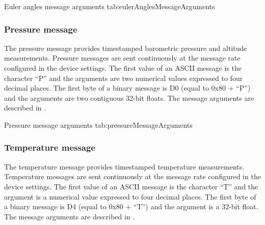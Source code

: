 \begingroup
    \def\tempArgumentA{Roll angle in degrees}
    \def\tempArgumentB{Pitch angle in degrees}
    \def\tempArgumentC{Yaw angle in degrees}
    \dataMessageTable
    {Euler angles message arguments}
    {tab:eulerAnglesMessageArguments}
\endgroup

\begingroup
    \def\tempNameA{Roll angle}
    \def\tempNameB{Pitch angle}
    \def\tempNameC{Yaw angle}
    \def\tempValueA{0.0}
    \def\tempValueB{0.0}
    \def\tempValueC{0.0}
    \def\tempAsciiFirst{E}
    \def\tempAsciiA{0.0000}
    \def\tempAsciiB{0.0000}
    \def\tempAsciiC{0.0000}
    \def\tempBinaryFirst{C5}
    \def\tempBinaryA{00 00 00 00}
    \def\tempBinaryB{00 00 00 00}
    \def\tempBinaryC{00 00 00 00}
    \dataMessageExample
\endgroup

\subsubsection{Pressure message}

The pressure message provides timestamped barometric pressure and altitude measurements.  Pressure messages are sent continuously at the message rate configured in the device settings.  The first value of an \ac{ASCII} message is the character \enquote{P} and the arguments are two numerical values expressed to four decimal places.  The first byte of a binary message is D0 (equal to 0x80 + \enquote{P}) and the arguments are two contiguous 32-bit floats.  The message arguments are described in .

\begingroup
    \def\tempArgumentA{Barometric air pressure in millibars}
    \def\tempArgumentB{Altitude in metres}
    \dataMessageTable
    {Pressure message arguments}
    {tab:pressureMessageArguments}
\endgroup

\begingroup
    \def\tempNameA{Pressure}
    \def\tempNameB{Altitude}
    \def\tempValueA{1023.14}
    \def\tempValueB{0.0}
    \def\tempAsciiFirst{P}
    \def\tempAsciiA{1023.1400}
    \def\tempAsciiB{0.0000}
    \def\tempBinaryFirst{D0}
    \def\tempBinaryA{00 50 7D 44}
    \def\tempBinaryB{00 00 00 00}
    \dataMessageExample
\endgroup

\subsubsection{Temperature message}

The temperature message provides timestamped temperature measurements.  Temperature messages are sent continuously at the message rate configured in the device settings.  The first value of an \ac{ASCII} message is the character \enquote{T} and the argument is a numerical value expressed to four decimal places.  The first byte of a binary message is D4 (equal to 0x80 + \enquote{T}) and the argument is a 32-bit float.  The message arguments are described in .


